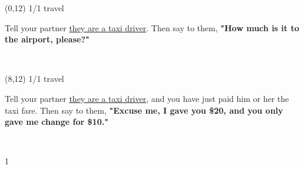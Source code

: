 \documentclass[a4paper]{article}
\newcommand{\mycard}[5]{%
	\vspace{0.1cm}
	\small #1 #2
	\par
	\parbox[t][6.7cm][c]{9.5cm}{%
	\hspace{0.1cm} \Large#3\\
	\normalsize#4 #5
	}
}
\begin{document}
\begin{textblock}{8}(0,12)
\mycard{1/1}{travel}{\parbox{9.0cm}{
Tell your partner \ul{they are a taxi driver}. Then say to them, \textbf{"How much is it to the airport, please?"}
}}{}{} 
\end{textblock}

\begin{textblock}{8}(8,12)
\mycard{1/1}{travel}{\parbox{9.0cm}{
Tell your partner \ul{they are a taxi driver}, and you have just paid him or her the taxi fare. Then say to them, \textbf{"Excuse me, I gave you \$20, and you only gave me change for \$10."}
}}{}{} 
\end{textblock}

\begin{tiny}1\end{tiny}\\
\newpage
\end{document}
